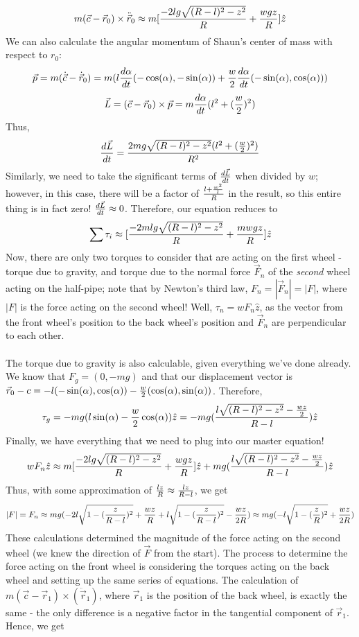 $$m(\vec c-\vec r_0)\times \ddot {\vec r}_0\approx m[\frac{-2lg\sqrt{(R-l)^2-z^2}}{R}+\frac{wgz}{R}]\hat z$$
We can also calculate the angular momentum of Shaun's center of mass with respect to $r_0$:
$$\vec p=m(\dot{\vec c}-\dot{\vec r}_0)=m(l\frac{d\alpha}{dt}(-\cos(\alpha), -\sin(\alpha))+\frac w 2 \frac{d\alpha}{dt}(-\sin(\alpha), \cos(\alpha)))$$
$$\vec L=(\vec c-\vec r_0)\times \vec p=m\frac{d\alpha}{dt}(l^2+(\frac w 2)^2)$$
Thus, 
$$\frac{d\vec L}{dt}=\frac{2mg\sqrt{(R-l)^2-z^2}(l^2+(\frac w 2)^2)}{R^2}$$
Similarly, we need to take the significant terms of $\frac{d\vec L}{dt}$ when divided by $w$; however, in this case, there will be a factor of $\frac{l+\frac{w^2}{l}}{R}$ in the result, so this entire thing is in fact zero!  $\frac{d\vec L}{dt}\approx 0$.
Therefore, our equation reduces to
$$\sum \tau_i\approx [\frac{-2mlg\sqrt{(R-l)^2-z^2}}{R}+\frac{mwgz}{R}]\hat z$$
Now, there are only two torques to consider that are acting on the first wheel - torque due to gravity, and torque due to the normal force $\vec F_n$ of the \textit{second} wheel acting on the half-pipe; note that by Newton's third law, $F_n=|\vec F_n|=|F|$, where $|F|$ is the force acting on the second wheel!  Well, $\tau_n=w F_n \hat z$, as the vector from the front wheel's position to the back wheel's position and $\vec F_n$ are perpendicular to each other.   
\\\\ The torque due to gravity is also calculable, given everything we've done already.  We know that $F_g=(0, -mg)$ and that our displacement vector is $\vec r_0-c=-l(-\sin(\alpha), \cos(\alpha))-\frac w 2(\cos(\alpha), \sin(\alpha))$.  Therefore, 
$$\tau_g=-mg(l\sin(\alpha)-\frac w 2 \cos(\alpha))\hat z=-mg(\frac{l\sqrt{(R-l)^2-z^2}-\frac {wz}{2}}{R-l})\hat z$$
Finally, we have everything that we need to plug into our master equation!
$$w F_n \hat z\approx  m[\frac{-2lg\sqrt{(R-l)^2-z^2}}{R}+\frac{wgz}{R}]\hat z+mg(\frac{l\sqrt{(R-l)^2-z^2}-\frac {wz}{2}}{R-l})\hat z$$
Thus, with some approximation of $\frac {lz} R\approx \frac {lz}{R-l}$, we get
$$|F|=F_n\approx mg(-2l\sqrt{1-(\frac z {R-l})^2}+ \frac {wz}{R}+l\sqrt{1-(\frac z {R-l})^2}-\frac {wz}{2R})\approx mg(-l\sqrt{1-(\frac z R)^2}+\frac{wz}{2R})$$
These calculations determined the magnitude of the force acting on the second wheel (we knew the direction of $\vec F$ from the start).  The process to determine the force acting on the front wheel is considering the torques acting on the back wheel and setting up the same series of equations.  The calculation of $m(\vec c - \vec r_1)\times (\ddot {\vec r}_1)$, where $\vec r_1$ is the position of the back wheel, is exactly the same - the only difference is a negative factor in the tangential component of $\vec r_1$.  Hence, we get
